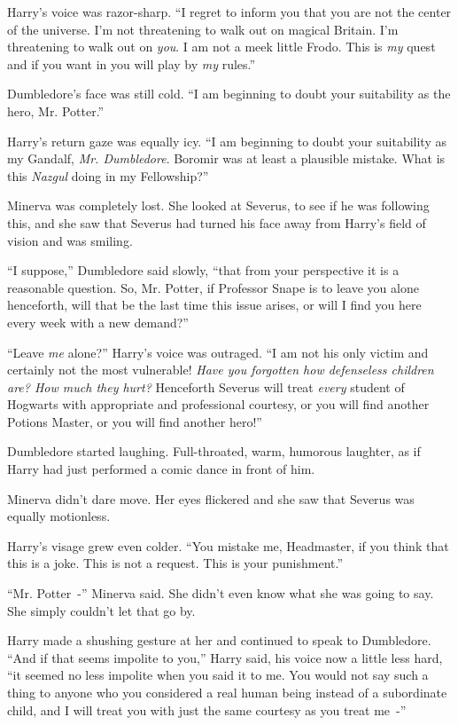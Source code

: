 Harry's voice was razor-sharp. ``I regret to inform you that you are not the center of the universe. I'm not threatening to walk out on magical Britain. I'm threatening to walk out on \emph{you}. I am not a meek little Frodo. This is \emph{my} quest and if you want in you will play by \emph{my} rules.''

Dumbledore's face was still cold. ``I am beginning to doubt your suitability as the hero, Mr. Potter.''

Harry's return gaze was equally icy. ``I am beginning to doubt your suitability as my Gandalf, \emph{Mr. Dumbledore}. Boromir was at least a plausible mistake. What is this \emph{Nazgul} doing in my Fellowship?''

Minerva was completely lost. She looked at Severus, to see if he was following this, and she saw that Severus had turned his face away from Harry's field of vision and was smiling.

``I suppose,'' Dumbledore said slowly, ``that from your perspective it is a reasonable question. So, Mr. Potter, if Professor Snape is to leave you alone henceforth, will that be the last time this issue arises, or will I find you here every week with a new demand?''

``Leave \emph{me} alone?'' Harry's voice was outraged. ``I am not his only victim and certainly not the most vulnerable! \emph{Have you forgotten how defenseless children are? How much they hurt?} Henceforth Severus will treat \emph{every} student of Hogwarts with appropriate and professional courtesy, or you will find another Potions Master, or you will find another hero!''

Dumbledore started laughing. Full-throated, warm, humorous laughter, as if Harry had just performed a comic dance in front of him.

Minerva didn't dare move. Her eyes flickered and she saw that Severus was equally motionless.

Harry's visage grew even colder. ``You mistake me, Headmaster, if you think that this is a joke. This is not a request. This is your punishment.''

``Mr. Potter~-'' Minerva said. She didn't even know what she was going to say. She simply couldn't let that go by.

Harry made a shushing gesture at her and continued to speak to Dumbledore. ``And if that seems impolite to you,'' Harry said, his voice now a little less hard, ``it seemed no less impolite when you said it to me. You would not say such a thing to anyone who you considered a real human being instead of a subordinate child, and I will treat you with just the same courtesy as you treat me~-''

